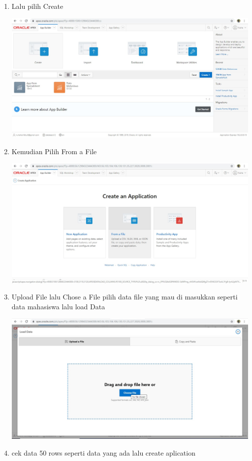 \documentclass[a4paper,12pt]{report}
\begin{document}
\begin{enumerate}
\begin{center}
    \end{center}
    \item Lalu pilih Create
    \begin{center}
    \includegraphics[width=11cm\textwidth]{figure/4.jpg}
    \end{center}
    \item Kemudian Pilih From a File
    \begin{center}
    \includegraphics[width=11cm\textwidth]{figure/5.jpg}
    \end{center}
    \item Upload File lalu Chose a File pilih data file yang mau di masukkan seperti data mahasiswa lalu load Data
    \begin{center}
    \includegraphics[width=11cm\textwidth]{figure/6.jpg}
    \end{center}
    \item cek data 50 rows seperti data yang ada lalu create aplication

\end{enumerate}
\end{document}
